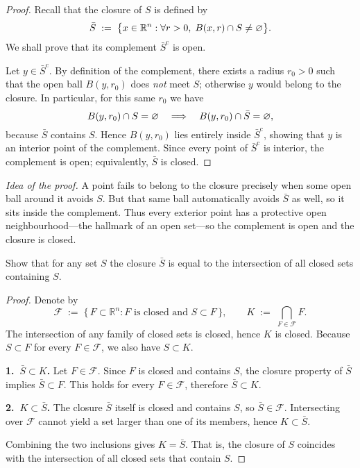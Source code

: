 \documentclass[10pt]{extarticle}
\begin{document}
\begin{proof}
    Recall that the closure of $S$ is defined by
    \[
        \bar{S}\;:=\;\bigl\{x\in\mathbb R^{n}:\forall r>0,\;B(x,r)\cap S\ne\varnothing\bigr\}.
    \]
    We shall prove that its complement $\bar{S}^{\mathrm c}$ is open.

    Let $y\in\bar{S}^{\mathrm c}$.  By definition of the complement, there exists a radius $r_{0}>0$ such that the open ball $B(y,r_{0})$ does \emph{not} meet $S$; otherwise $y$ would belong to the closure.  In particular, for this same $r_{0}$ we have
    \[
        B(y,r_{0})\cap S=\varnothing \quad\Longrightarrow\quad B(y,r_{0})\cap \bar{S}=\varnothing,
    \]
    because $\bar{S}$ contains $S$.  Hence $B(y,r_{0})$ lies entirely inside $\bar{S}^{\mathrm c}$, showing that $y$ is an interior point of the complement.  Since every point of $\bar{S}^{\mathrm c}$ is interior, the complement is open; equivalently, $\bar{S}$ is closed.
\end{proof}

\begin{remark}
    \emph{Idea of the proof.}  A point fails to belong to the closure precisely when some open ball around it avoids $S$.  But that same ball automatically avoids $\bar{S}$ as well, so it sits inside the complement.  Thus every exterior point has a protective open neighbourhood—the hallmark of an open set—so the complement is open and the closure is closed.
\end{remark}

\begin{exercise}[4.8]
    Show that for any set $S$ the closure $\bar{S}$ is equal to the intersection of all closed sets containing $S$.
\end{exercise}

\begin{proof}
    Denote by
    \[
        \mathcal{F}\;:=\;\bigl\{\,F\subset\mathbb R^{n}:F\text{ is closed and }S\subset F\,\bigr\},
        \qquad
        K\;:=\;\bigcap_{F\in\mathcal{F}}F.
    \]
    The intersection of any family of closed sets is closed, hence $K$ is closed.  Because $S\subset F$ for every $F\in\mathcal{F}$, we also have $S\subset K$.

    \medskip
    \textbf{1.~$\bar S\subset K$.}  Let $F\in\mathcal{F}$.  Since $F$ is closed and contains $S$, the closure property of $\bar S$ implies $\bar S\subset F$.  This holds for every $F\in\mathcal{F}$, therefore $\bar S\subset K$.

    \medskip
    \textbf{2.~$K\subset\bar S$.}  The closure $\bar S$ itself is closed and contains $S$, so $\bar S\in\mathcal{F}$.  Intersecting over $\mathcal{F}$ cannot yield a set larger than one of its members, hence $K\subset\bar S$.

    \medskip
    Combining the two inclusions gives $K=\bar S$.  That is, the closure of $S$ coincides with the intersection of all closed sets that contain $S$.
\end{proof}
\end{document}
